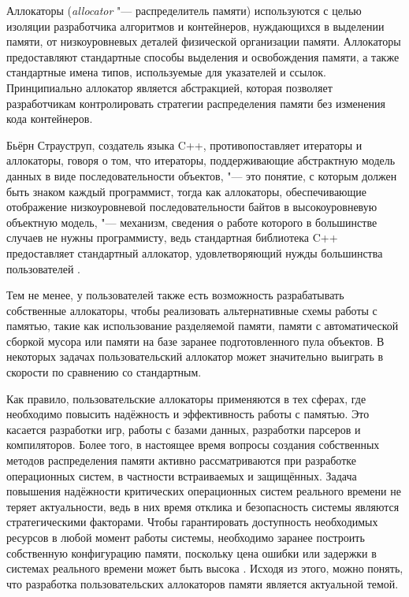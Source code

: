 Аллокаторы (\textit{allocator} "--- распределитель памяти) используются с целью изоляции разработчика алгоритмов и контейнеров, нуждающихся в выделении памяти, от низкоуровневых деталей физической организации памяти. Аллокаторы предоставляют стандартные способы выделения и освобождения памяти, а также стандартные имена типов, используемые для указателей и ссылок. Принципиально аллокатор является абстракцией, которая позволяет разработчикам контролировать стратегии распределения памяти без изменения кода контейнеров.

Бьёрн Страуструп, создатель языка C++, противопоставляет итераторы и аллокаторы, говоря о том, что итераторы, поддерживающие абстрактную модель данных в виде последовательности объектов, "--- это понятие, с которым должен быть знаком каждый программист, тогда как аллокаторы, обеспечивающие отображение низкоуровневой последовательности байтов в высокоуровневую объектную модель, "--- механизм, сведения о работе которого в большинстве случаев не нужны программисту, ведь стандартная библиотека C++ предоставляет стандартный аллокатор, удовлетворяющий нужды большинства пользователей \cite{straustrup}.

Тем не менее, у пользователей также есть возможность разрабатывать собственные аллокаторы, чтобы реализовать альтернативные схемы работы с памятью, такие как использование разделяемой памяти, памяти с автоматической сборкой мусора или памяти на базе заранее подготовленного пула объектов. В некоторых задачах пользовательский аллокатор может значительно выиграть в скорости по сравнению со стандартным.

Как правило, пользовательские аллокаторы применяются в тех сферах, где необходимо повысить надёжность и эффективность работы с памятью. Это касается разработки игр, работы с базами данных, разработки парсеров и компиляторов. Более того, в настоящее время вопросы создания собственных методов распределения памяти активно рассматриваются при разработке операционных систем, в частности встраиваемых и защищённых. Задача повышения надёжности критических операционных систем реального времени не теряет актуальности, ведь в них время отклика и безопасность системы являются стратегическими факторами. Чтобы гарантировать доступность необходимых ресурсов в любой момент работы системы, необходимо заранее построить собственную конфигурацию памяти, поскольку цена ошибки или задержки в системах реального времени может быть высока \cite{isp-ran}. Исходя из этого, можно понять, что разработка пользовательских аллокаторов памяти является актуальной темой.

